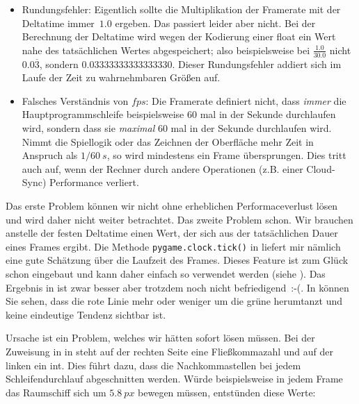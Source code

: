 \begin{itemize}
    \item Rundungsfehler: Eigentlich sollte die Multiplikation der Framerate mit der Deltatime immer~$1.0$ ergeben. Das passiert leider aber nicht. Bei der Berechnung der Deltatime wird wegen der Kodierung einer \gls{float} ein Wert nahe des tatsächlichen Wertes abgespeichert; also beispielsweise bei $\frac{1.0}{30.0}$ nicht $0.0\overline{3}$, sondern $0.03333333333333330$. Dieser Rundungsfehler addiert sich im Laufe der Zeit zu wahrnehmbaren Größen auf.

    \item Falsches Verständnis von $fps$: Die Framerate definiert nicht, dass \emph{immer} die Hauptprogrammschleife beispielsweise 60 mal in der Sekunde durchlaufen wird, sondern dass sie \emph{maximal} 60 mal in der Sekunde durchlaufen wird. Nimmt die Spiellogik oder das Zeichnen der Oberfläche mehr Zeit in Anspruch als $1/60~s$, so wird mindestens ein Frame übersprungen. Dies tritt auch auf, wenn der Rechner durch andere Operationen (z.B. einer Cloud-Sync) Performance verliert. 
\end{itemize}

Das erste Problem können wir nicht ohne erheblichen Performaceverlust lösen und wird daher nicht weiter betrachtet. Das zweite Problem schon. Wir brauchen anstelle der festen Deltatime einen Wert, der sich aus der tatsächlichen Dauer eines Frames ergibt. Die Methode \texttt{pygame.clock.tick()} in  liefert mir nämlich eine gute Schätzung über die Laufzeit des Frames. Dieses Feature ist zum Glück schon eingebaut und kann daher einfach so verwendet werden (siehe ). Das Ergebnis in  ist zwar besser aber trotzdem noch nicht befriedigend~{:-(}. In  können Sie sehen, dass die rote Linie mehr oder weniger um die grüne herumtanzt und keine eindeutige Tendenz sichtbar ist.


\newpage
{}

Ursache ist ein Problem, welches wir hätten sofort lösen müssen. Bei der Zuweisung in  in  steht auf der rechten Seite eine Fließkommazahl und auf der linken ein \gls{int}. Dies führt dazu, dass die Nachkommastellen bei jedem Schleifendurchlauf abgeschnitten werden. Würde beispielsweise in jedem Frame das Raumschiff sich um $5.8~px$ bewegen müssen, entstünden diese Werte:

